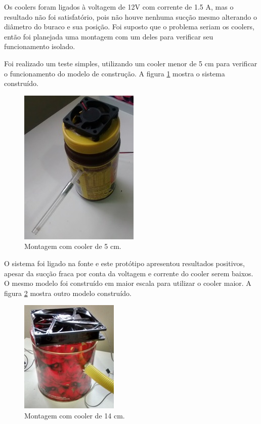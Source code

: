 		Os coolers foram ligados à voltagem de 12V com corrente de 1.5 A, mas o resultado não foi satisfatório, pois não houve nenhuma sucção mesmo alterando o diâmetro do buraco e sua posição. Foi suposto que o problema seriam os coolers, então foi planejada uma montagem com um deles para verificar seu funcionamento isolado.

		Foi realizado um teste simples, utilizando um cooler menor de 5 cm para verificar o funcionamento do modelo de construção. A figura \ref{img:cooler_5cm} mostra o sistema construído.

		\begin{figure}[H]
			\centering
			\includegraphics[scale=1]{figuras/asppc2_2.jpg}
			\caption{Montagem com cooler de 5 cm.}
			\label{img:cooler_5cm}
		\end{figure}

		O sistema foi ligado na fonte e este protótipo apresentou resultados positivos, apesar da sucção fraca por conta da voltagem e corrente do cooler serem baixos. O mesmo modelo foi construído em maior escala para utilizar o cooler maior. A figura \ref{img:cooler_14cm} mostra outro modelo construído.

		\begin{figure}[H]
			\centering
			\includegraphics[scale=1]{figuras/asppc2_3.jpg}
			\caption{Montagem com cooler de 14 cm.}
			\label{img:cooler_14cm}
		\end{figure}

